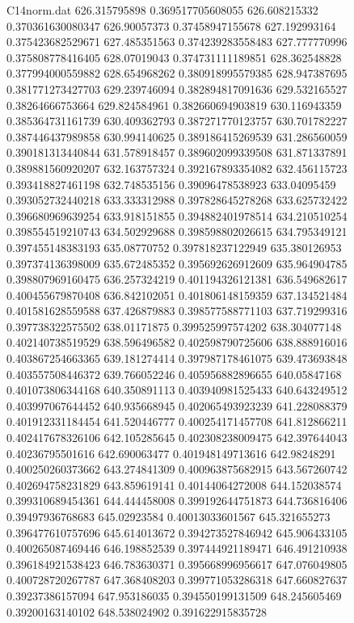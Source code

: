 \begin{filecontents}{C14norm.dat}
626.315795898			0.369517705608055
626.608215332			0.370361630080347
626.90057373			0.37458947155678
627.192993164			0.375423682529671
627.485351563			0.374239283558483
627.777770996			0.375808778416405
628.07019043			0.374731111189851
628.362548828			0.377994000559882
628.654968262			0.380918995579385
628.947387695			0.381771273427703
629.239746094			0.382894817091636
629.532165527			0.38264666753664
629.824584961			0.382660694903819
630.116943359			0.385364731161739
630.409362793			0.387271770123757
630.701782227			0.387446437989858
630.994140625			0.389186415269539
631.286560059			0.390181313440844
631.578918457			0.389602099339508
631.871337891			0.389881560920207
632.163757324			0.392167893354082
632.456115723			0.393418827461198
632.748535156			0.39096478538923
633.04095459			0.393052732440218
633.333312988			0.397828645278268
633.625732422			0.396680969639254
633.918151855			0.394882401978514
634.210510254			0.398554519210743
634.502929688			0.398598802026615
634.795349121			0.397455148383193
635.08770752			0.397818237122949
635.380126953			0.397374136398009
635.672485352			0.395692626912609
635.964904785			0.398807969160475
636.257324219			0.401194326121381
636.549682617			0.400455679870408
636.842102051			0.401806148159359
637.134521484			0.401581628559588
637.426879883			0.398577588771103
637.719299316			0.397738322575502
638.01171875			0.399525997574202
638.304077148			0.402140738519529
638.596496582			0.402598790725606
638.888916016			0.403867254663365
639.181274414			0.397987178461075
639.473693848			0.403557508446372
639.766052246			0.405956882896655
640.05847168			0.401073806344168
640.350891113			0.403940981525433
640.643249512			0.403997067644452
640.935668945			0.402065493923239
641.228088379			0.401912331184454
641.520446777			0.400254171457708
641.812866211			0.402417678326106
642.105285645			0.402308238009475
642.397644043			0.40236795501616
642.690063477			0.401948149713616
642.98248291			0.400250260373662
643.274841309			0.400963875682915
643.567260742			0.402694758231829
643.859619141			0.40144064272008
644.152038574			0.399310689454361
644.444458008			0.399192644751873
644.736816406			0.39497936768683
645.02923584			0.40013033601567
645.321655273			0.396477610757696
645.614013672			0.394273527846942
645.906433105			0.400265087469446
646.198852539			0.397444921189471
646.491210938			0.396184921538423
646.783630371			0.395668996956617
647.076049805			0.400728720267787
647.368408203			0.399771053286318
647.660827637			0.39237386157094
647.953186035			0.394550199131509
648.245605469			0.39200163140102
648.538024902			0.391622915835728

\end{filecontents}
